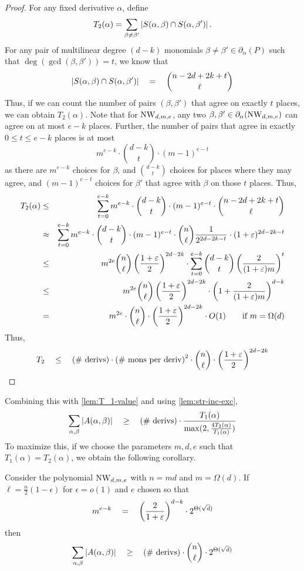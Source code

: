 \begin{proof}
For any fixed derivative $\alpha$, define \[T_2(\alpha) = \sum_{\beta\neq \beta'}\left|S(\alpha, \beta)\cap S(\alpha, \beta')\right|.\] 
For any pair of multilinear degree $(d-k)$ monomials $\beta \neq \beta' \in \partial_\alpha(P)$ such that $\deg(\gcd(\beta, \beta')) = t$, we know that 
\[
\left|S(\alpha, \beta)\cap S(\alpha, \beta')\right| \quad = \quad \binom{n - 2d + 2k +t}{\ell}
\]
Thus, if we can count the number of pairs $(\beta, \beta')$ that agree on exactly $t$ places, we can obtain $T_2(\alpha)$. Note that for $\mathrm{NW}_{d,m,e}$, any two $\beta, \beta' \in\partial_\alpha(\mathrm{NW}_{d,m,e})$ can agree on at most $e-k$ places. Further, the number of pairs that agree in exactly $0\leq t\leq e-k$ places is at most
\[
m^{e-k} \cdot \binom{d-k}{t} \cdot (m-1)^{e-t}
\]
as there are $m^{e-k}$ choices for $\beta$, and $\binom{d-k}{t}$ choices for places where they may agree, and $(m-1)^{e-t}$ choices for $\beta'$ that agree with $\beta$ on those $t$ places. Thus,
\begin{eqnarray*}
T_2(\alpha) &\leq& \sum_{t=0}^{e-k} m^{e-k} \cdot \binom{d-k}{t} \cdot (m-1)^{e-t} \cdot  \binom{n - 2d + 2k +t}{\ell}\\
& \approx  & \sum_{t=0}^{e-k} m^{e-k} \cdot \binom{d-k}{t} \cdot (m-1)^{e-t} \cdot  \binom{n}{\ell} \frac{1}{2^{2d-2k -t}}\cdot (1+\varepsilon)^{2d - 2k - t}\\
& \leq & m^{2e}\binom{n}{\ell}\left(\frac{1+\varepsilon}{2}\right)^{2d -2k}\cdot\sum_{t=0}^{e-k}\binom{d-k}{t}\left(\frac{2}{(1+\varepsilon)m}\right)^t\\
& \leq & m^{2e}\binom{n}{\ell}\left(\frac{1+\varepsilon}{2}\right)^{2d -2k}\cdot \left(1+\frac{2}{(1+\varepsilon)m}\right)^{d-k}\\
& = & m^{2e}\cdot \binom{n}{\ell} \cdot \left(\frac{1+\varepsilon}{2}\right)^{2d -2k}\cdot O(1) \qquad\text{if $m = \Omega(d)$}
\end{eqnarray*}
Thus,
\[
T_2 \quad \leq \quad\text{(\# derivs)} \cdot \text{(\# mons per deriv)}^2\cdot \binom{n}{\ell} \cdot \left(\frac{1+\varepsilon}{2}\right)^{2d -2k}
\]
\end{proof}
Combining this with \autoref{lem:T_1-value} and using \autoref{lem:str-inc-exc},
\[
\sum_{\alpha,\beta}\left|A(\alpha, \beta)\right| \quad \geq \quad \text{(\# derivs)}\cdot \frac{T_1(\alpha)}{\max(2, \frac{4T_2(\alpha)}{T_1(\alpha)})}
\]
To maximize this, if we choose the parameters $m,d,e$ such that $T_1(\alpha) = T_2(\alpha)$, we obtain the following corollary. 
\begin{corollary}\label{cor:T2-bound}
Consider the polynomial $\mathrm{NW}_{d,m,e}$ with $n = md$ and $m = \Omega(d)$. If $\ell = \frac{n}{2}(1 - \epsilon)$ for $\epsilon = o(1)$ and $e$ chosen so that
\[
m^{e-k} \quad = \quad \left(\frac{2}{1+\varepsilon}\right)^{d-k} \cdot 2^{\Theta(\sqrt{d})}
\]
then
\[
\sum_{\alpha, \beta}\left|A(\alpha, \beta)\right| \quad \geq \quad \text{(\# derivs)}\cdot  \binom{n}{\ell} \cdot 2^{\Theta(\sqrt{d})}
\]
\end{corollary}

